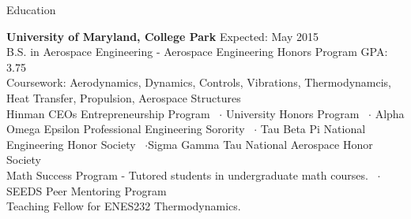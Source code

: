 \documentclass{resume} %
\begin{document}

\begin{rSection}{Education}

{\bf University of Maryland, College Park} \hfill { Expected: May 2015} \\
B.S. in Aerospace Engineering - Aerospace Engineering Honors Program \hfill {GPA: 3.75} \\
Coursework: Aerodynamics, Dynamics, Controls, Vibrations, Thermodynamcis, Heat Transfer, Propulsion, Aerospace Structures\\
Hinman CEOs Entrepreneurship Program ~$\cdot$ University Honors Program ~$\cdot$  Alpha Omega Epsilon Professional Engineering Sorority ~$\cdot$ Tau Beta Pi National Engineering Honor Society ~$\cdot$Sigma Gamma Tau National Aerospace Honor Society\\
Math Success Program - Tutored students in undergraduate math courses. ~$\cdot$SEEDS Peer Mentoring Program \\
Teaching Fellow for ENES232 Thermodynamics. \\
\end{rSection}

\end{document}
